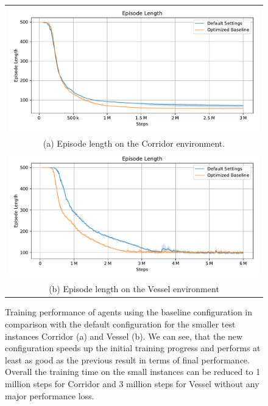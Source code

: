 \begin{figure}[htp]
    \begin{center}
        \begin{tabular}{c}
            \includegraphics[clip, width=0.95\columnwidth]{figures/evaluation/baseline/maze0318_ep_len.pdf} \\
            {\small (a) Episode length on the Corridor environment.} \\
            \addlinespace[0.75cm]
            \includegraphics[clip, width=0.95\columnwidth]{figures/evaluation/baseline/vessel_ep_len.pdf} \\
            {\small (b) Episode length on the Vessel environment} \\
        \end{tabular}

    \end{center}
    \caption[Training Performance of Baseline Agents on Small Instances]{Training performance of agents using the baseline configuration in comparison with the default configuration for the smaller test instances Corridor (a) and Vessel (b). We can see, that the new configuration speeds up the initial training progress and performs at least as good as the previous result in terms of final performance. Overall the training time on the small instances can be reduced to 1 million steps for Corridor and 3 million steps for Vessel without any major performance loss.} \label{fig:Eval/Baselines/SmallInstances}
\end{figure}

